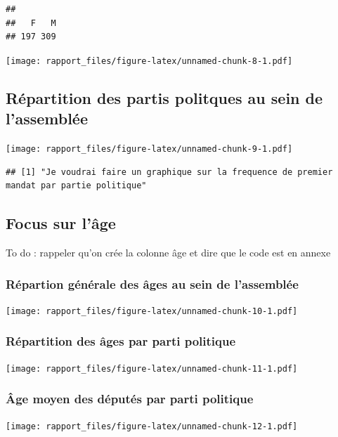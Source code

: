 \documentclass[]{article}
\begin{document}
\begin{verbatim}
## 
##   F   M 
## 197 309
\end{verbatim}

\texttt{[image: rapport\_files/figure-latex/unnamed-chunk-8-1.pdf]}

\hypertarget{ruxe9partition-des-partis-politques-au-sein-de-lassembluxe9e}{%
\subsection{Répartition des partis politques au sein de
l'assemblée}\label{ruxe9partition-des-partis-politques-au-sein-de-lassembluxe9e}}

\texttt{[image: rapport\_files/figure-latex/unnamed-chunk-9-1.pdf]}

\begin{verbatim}
## [1] "Je voudrai faire un graphique sur la frequence de premier mandat par partie politique"
\end{verbatim}

\hypertarget{focus-sur-luxe2ge}{%
\subsection{Focus sur l'âge}\label{focus-sur-luxe2ge}}

To do : rappeler qu'on crée la colonne âge et dire que le code est en
annexe

\hypertarget{ruxe9partion-guxe9nuxe9rale-des-uxe2ges-au-sein-de-lassembluxe9e}{%
\subsubsection{Répartion générale des âges au sein de
l'assemblée}\label{ruxe9partion-guxe9nuxe9rale-des-uxe2ges-au-sein-de-lassembluxe9e}}

\texttt{[image: rapport\_files/figure-latex/unnamed-chunk-10-1.pdf]}

\hypertarget{ruxe9partition-des-uxe2ges-par-parti-politique}{%
\subsubsection{Répartition des âges par parti
politique}\label{ruxe9partition-des-uxe2ges-par-parti-politique}}

\texttt{[image: rapport\_files/figure-latex/unnamed-chunk-11-1.pdf]}

\hypertarget{uxe2ge-moyen-des-duxe9putuxe9s-par-parti-politique}{%
\subsubsection{Âge moyen des députés par parti
politique}\label{uxe2ge-moyen-des-duxe9putuxe9s-par-parti-politique}}

\texttt{[image: rapport\_files/figure-latex/unnamed-chunk-12-1.pdf]}
\end{document}

